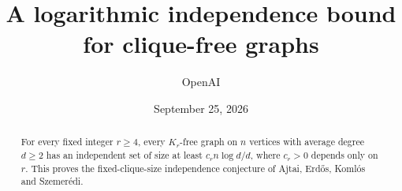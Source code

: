 \documentclass[11pt]{article}
\title{A logarithmic independence bound for clique-free graphs}
\author{OpenAI}
\date{September 25, 2026}
\begin{document}
\maketitle
\begin{abstract}
For every fixed integer $r\ge4$, every $K_r$-free graph on $n$ vertices
with average degree $d\ge2$ has an independent set of size at least
$c_r n\log d/d$, where $c_r>0$ depends only on $r$.
This proves the fixed-clique-size independence conjecture of Ajtai,
Erd\H{o}s, Koml\'os and Szemer\'edi.
\end{abstract}
\setcounter{tocdepth}{1}
\tableofcontents
\clearpage








\end{document}

